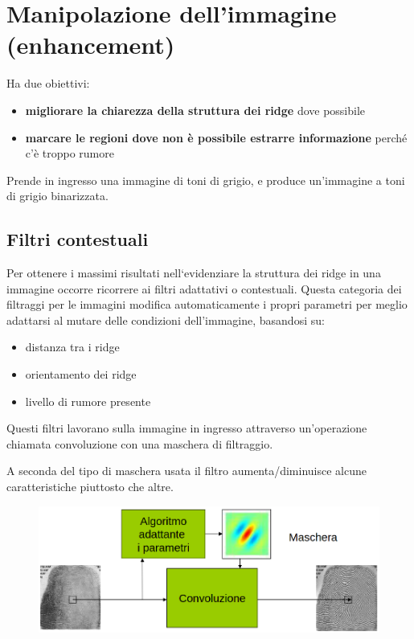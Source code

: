 \documentclass{report}
\begin{document}
\section{Manipolazione dell'immagine (enhancement)}

Ha due obiettivi:
\begin{itemize}
    \item \textbf{migliorare la chiarezza della struttura dei ridge} dove possibile
    \item \textbf{marcare le regioni dove non è possibile estrarre informazione} perché c'è troppo rumore
\end{itemize}

\noindent Prende in ingresso una immagine di toni di grigio, e produce un'immagine 
a toni di grigio binarizzata.

\subsection{Filtri contestuali}

Per ottenere i massimi risultati nell‘evidenziare la
struttura dei ridge in una immagine occorre ricorrere ai
filtri adattativi o contestuali. Questa categoria dei filtraggi per le immagini modifica
automaticamente i propri parametri per meglio adattarsi
al mutare delle condizioni dell’immagine, basandosi su:
\begin{itemize}
    \item distanza tra i ridge
    \item orientamento dei ridge
    \item livello di rumore presente
\end{itemize}

\noindent Questi filtri lavorano sulla immagine in ingresso
attraverso un’operazione chiamata convoluzione con una
maschera di filtraggio.

\noindent A seconda del tipo di maschera usata il filtro
aumenta/diminuisce alcune caratteristiche piuttosto che
altre.

\begin{figure}[ht]
    \centering
    \includegraphics[width=0.6\linewidth]{images/filtro-contestuale.png}
\end{figure}
\end{document}
